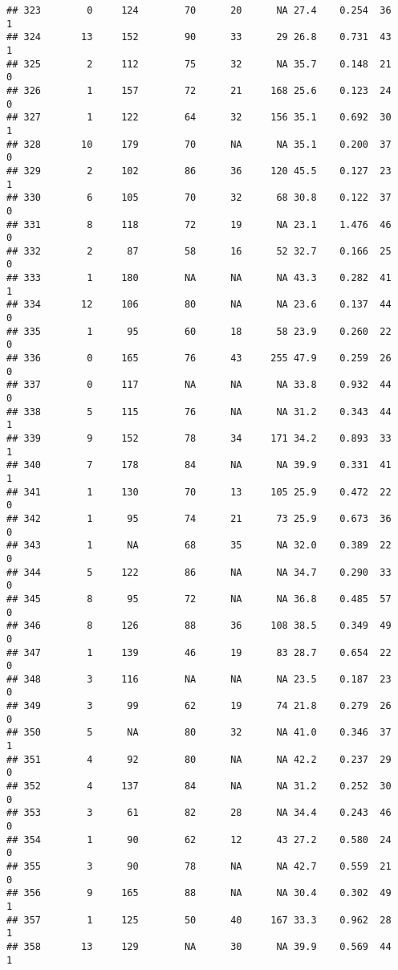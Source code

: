 \documentclass[
]{article}
\begin{document}
\begin{verbatim}
## 323        0     124        70      20      NA 27.4    0.254  36    1
## 324       13     152        90      33      29 26.8    0.731  43    1
## 325        2     112        75      32      NA 35.7    0.148  21    0
## 326        1     157        72      21     168 25.6    0.123  24    0
## 327        1     122        64      32     156 35.1    0.692  30    1
## 328       10     179        70      NA      NA 35.1    0.200  37    0
## 329        2     102        86      36     120 45.5    0.127  23    1
## 330        6     105        70      32      68 30.8    0.122  37    0
## 331        8     118        72      19      NA 23.1    1.476  46    0
## 332        2      87        58      16      52 32.7    0.166  25    0
## 333        1     180        NA      NA      NA 43.3    0.282  41    1
## 334       12     106        80      NA      NA 23.6    0.137  44    0
## 335        1      95        60      18      58 23.9    0.260  22    0
## 336        0     165        76      43     255 47.9    0.259  26    0
## 337        0     117        NA      NA      NA 33.8    0.932  44    0
## 338        5     115        76      NA      NA 31.2    0.343  44    1
## 339        9     152        78      34     171 34.2    0.893  33    1
## 340        7     178        84      NA      NA 39.9    0.331  41    1
## 341        1     130        70      13     105 25.9    0.472  22    0
## 342        1      95        74      21      73 25.9    0.673  36    0
## 343        1      NA        68      35      NA 32.0    0.389  22    0
## 344        5     122        86      NA      NA 34.7    0.290  33    0
## 345        8      95        72      NA      NA 36.8    0.485  57    0
## 346        8     126        88      36     108 38.5    0.349  49    0
## 347        1     139        46      19      83 28.7    0.654  22    0
## 348        3     116        NA      NA      NA 23.5    0.187  23    0
## 349        3      99        62      19      74 21.8    0.279  26    0
## 350        5      NA        80      32      NA 41.0    0.346  37    1
## 351        4      92        80      NA      NA 42.2    0.237  29    0
## 352        4     137        84      NA      NA 31.2    0.252  30    0
## 353        3      61        82      28      NA 34.4    0.243  46    0
## 354        1      90        62      12      43 27.2    0.580  24    0
## 355        3      90        78      NA      NA 42.7    0.559  21    0
## 356        9     165        88      NA      NA 30.4    0.302  49    1
## 357        1     125        50      40     167 33.3    0.962  28    1
## 358       13     129        NA      30      NA 39.9    0.569  44    1

\end{verbatim}
\end{document}
